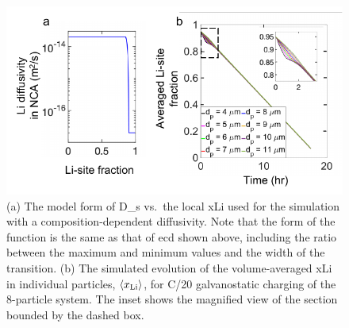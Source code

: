 \documentclass{article}
\begin{document}
\newpage
\begin{figure}[!h]
  \includegraphics[scale =1]{figures/modeling_figure_2.pdf}
  \caption{(a) The model form of \gls{D_s} vs.\ the local
    \gls{xLi} used for the simulation with a
    composition-dependent diffusivity. Note that the form of the
    function is the same as that of \gls{ecd} shown above, including
    the ratio between the maximum and minimum values and the width of
    the transition. (b) The simulated evolution of the volume-averaged
    \gls{xLi} in individual particles, $\langle x_{\rm{Li}} \rangle$,
    for C/20 galvanostatic charging of the 8-particle system. The
    inset shows the magnified view of the section bounded by the
    dashed box.}
  \label{fig:model-2}
\end{figure}


\newpage


\end{document}
